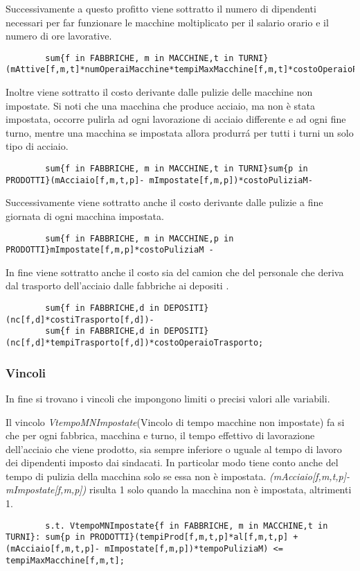 \documentclass[12pt]{article} %
\begin{document}
		Successivamente a questo profitto viene sottratto il numero di dipendenti necessari per far funzionare le macchine moltiplicato per il salario orario e il numero di ore lavorative.
		\begin{lstlisting}
		sum{f in FABBRICHE, m in MACCHINE,t in TURNI}(mAttive[f,m,t]*numOperaiMacchine*tempiMaxMacchine[f,m,t]*costoOperaioProduzione)-
		\end{lstlisting}

		Inoltre viene sottratto il costo derivante dalle pulizie delle macchine non impostate.
		Si noti che una macchina che produce acciaio, ma non è stata impostata, occorre pulirla ad ogni lavorazione di acciaio differente e ad ogni fine turno, mentre una macchina se impostata allora produrr\'a per tutti i turni un solo tipo di acciaio.
		\begin{lstlisting}
		sum{f in FABBRICHE, m in MACCHINE,t in TURNI}sum{p in PRODOTTI}(mAcciaio[f,m,t,p]- mImpostate[f,m,p])*costoPuliziaM-
		\end{lstlisting}

		Successivamente viene sottratto anche il costo derivante dalle pulizie a fine giornata di ogni macchina impostata.
		\begin{lstlisting}
		sum{f in FABBRICHE, m in MACCHINE,p in PRODOTTI}mImpostate[f,m,p]*costoPuliziaM -
		\end{lstlisting}

		In fine viene sottratto anche il costo sia del camion che del personale che deriva dal trasporto dell'acciaio dalle fabbriche ai depositi .
		\begin{lstlisting}
		sum{f in FABBRICHE,d in DEPOSITI}(nc[f,d]*costiTrasporto[f,d])-
		sum{f in FABBRICHE,d in DEPOSITI}(nc[f,d]*tempiTrasporto[f,d])*costoOperaioTrasporto;
		\end{lstlisting}


	\subsubsection{Vincoli}
		In fine si trovano i vincoli che impongono limiti o precisi valori alle variabili.

		Il vincolo \textit{VtempoMNImpostate}(Vincolo di tempo macchine non impostate) fa si che per ogni fabbrica, macchina e turno, il tempo effettivo di lavorazione dell'acciaio che viene prodotto, sia sempre inferiore o uguale al tempo di lavoro dei dipendenti imposto dai sindacati.
		In particolar modo tiene conto anche del tempo di pulizia della macchina solo se essa non è impostata.
		\textit{(mAcciaio[f,m,t,p]- mImpostate[f,m,p])} risulta 1 solo quando la macchina non è impostata, altrimenti 1.
		\begin{lstlisting}
		s.t. VtempoMNImpostate{f in FABBRICHE, m in MACCHINE,t in TURNI}: sum{p in PRODOTTI}(tempiProd[f,m,t,p]*al[f,m,t,p] + (mAcciaio[f,m,t,p]- mImpostate[f,m,p])*tempoPuliziaM) <= tempiMaxMacchine[f,m,t];
		\end{lstlisting}
\end{document}
